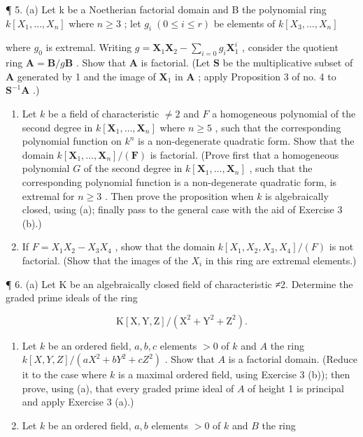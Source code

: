 ¶ 5. (a) Let k be a Noetherian factorial domain and B the polynomial ring \(k[X_{1},\ldots,X_{n}]\) where \(n\geqslant3\) ; let \(g_{i}\;(0\leqslant i\leqslant r)\) be elements of \(k[X_{3},\ldots,X_{n}]\)

where \(g_0\) is extremal. Writing \(g = \mathbf{X}_1\mathbf{X}_2 - \sum_{i=0} g_i\mathbf{X}_1^i\) , consider the quotient ring \(\mathbf{A} = \mathbf{B}/g\mathbf{B}\) . Show that \(\mathbf{A}\) is factorial. (Let \(\mathbf{S}\) be the multiplicative subset of \(\mathbf{A}\) generated by 1 and the image of \(\mathbf{X}_1\) in \(\mathbf{A}\) ; apply Proposition 3 of no. 4 to \(\mathbf{S}^{-1}\mathbf{A}\) .)

\begin{enumerate}
\def\labelenumi{(\alph{enumi})}
\setcounter{enumi}{1}
\item
  Let \(k\) be a field of characteristic \(\neq 2\) and \(F\) a homogeneous polynomial of the second degree in \(k[\mathbf{X}_1, \ldots, \mathbf{X}_n]\) where \(n \geqslant 5\) , such that the corresponding polynomial function on \(k^n\) is a non-degenerate quadratic form. Show that the domain \(k[\mathbf{X}_1, \ldots, \mathbf{X}_n] / (\mathbf{F})\) is factorial. (Prove first that a homogeneous polynomial \(G\) of the second degree in \(k[\mathbf{X}_1, \ldots, \mathbf{X}_n]\) , such that the corresponding polynomial function is a non-degenerate quadratic form, is extremal for \(n \geqslant 3\) . Then prove the proposition when \(k\) is algebraically closed, using (a); finally pass to the general case with the aid of Exercise 3 (b).)
\item
  If \(F = X_{1}X_{2} - X_{3}X_{4}\) , show that the domain \(k[X_{1}, X_{2}, X_{3}, X_{4}]/(F)\) is not factorial. (Show that the images of the \(X_{i}\) in this ring are extremal elements.)
\end{enumerate}

¶ 6. (a) Let K be an algebraically closed field of characteristic ≠2. Determine the graded prime ideals of the ring

\[
\mathrm{K} [ \mathrm{X}, \mathrm{Y}, \mathrm{Z} ] / (\mathrm{X} ^ {2} + \mathrm{Y} ^ {2} + \mathrm{Z} ^ {2}).
\]

\begin{enumerate}
\def\labelenumi{(\alph{enumi})}
\setcounter{enumi}{1}
\item
  Let \(k\) be an ordered field, \(a, b, c\) elements \(>0\) of \(k\) and \(A\) the ring \(k[X, Y, Z] / (aX^2 + bY^2 + cZ^2)\) . Show that \(A\) is a factorial domain. (Reduce it to the case where \(k\) is a maximal ordered field, using Exercise 3 (b)); then prove, using (a), that every graded prime ideal of \(A\) of height 1 is principal and apply Exercise 3 (a).)
\item
  Let \(k\) be an ordered field, \(a, b\) elements \(> 0\) of \(k\) and \(B\) the ring
\end{enumerate}

